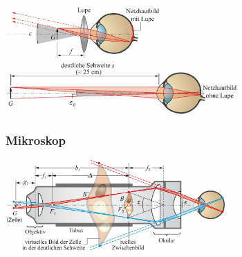 \begin{center}
	\begin{minipage}{0.18\textwidth}
		\\
		
		 \\
		 \\
		 \\
		 \\
		 \\
		 \\
	\end{minipage}%
	\begin{minipage}{0.3\textwidth}
		\includegraphics[height=2cm,keepaspectratio=true]{Images/lupe.png}
		\includegraphics[height=2cm,keepaspectratio=true]{Images/deutliche_sichtweite.png}
	\end{minipage}
\end{center}





\subsubsection{Mikroskop}

\begin{center}
	\begin{minipage}{0.18\textwidth}
	\end{minipage}%
	\begin{minipage}{0.3\textwidth}
		\includegraphics[height=3.5cm,keepaspectratio=true]{Images/mikroskop.png}
	\end{minipage}
\end{center}

